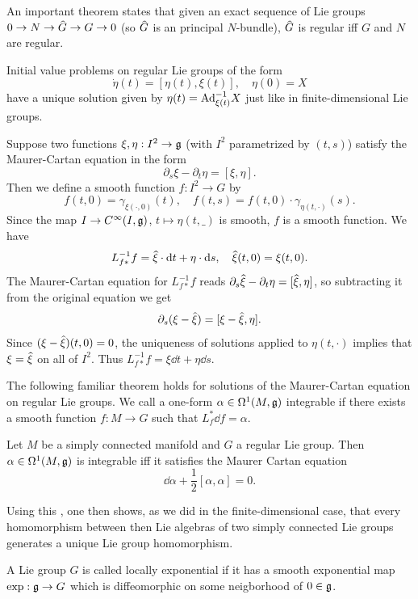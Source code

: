An important theorem states that given an exact sequence of Lie groups $0\to N\to \wh{G}\to G\to 0$ (so $\wh{G}$ is an principal $N$-bundle), $\wh{G}$ is regular iff $G$ and $N$ are regular.

Initial value problems on regular Lie groups of the form
\[\dot\eta(t)=[\eta(t),\xi(t)],\quad \eta(0)=X\]
have a unique solution given by $\eta(t)=\mathrm{Ad}_{\xi(t)}^{-1
}X$ just like in finite-dimensional Lie groups.


\begin{rem}
    Suppose two functions $\xi,\eta:I^2\to \mathfrak{g}$ (with $I^2$ parametrized by $(t,s)$) satisfy the Maurer-Cartan equation in the form
    \[\partial_s \xi-\partial_t \eta=[\xi,\eta].\]
    Then we define a smooth function $f:I^2\to G$ by
    \[f(t,0)=\gamma_{\xi(\cdot,0)}(t),\quad f(t,s)=f(t,0)\cdot \gamma_{\eta(t,\cdot)}(s).\]
    Since the map $I\to C^\infty(I,\mathfrak{g})$, $t\mapsto \eta(t,\_)$ is smooth, $f$ is a smooth function. We have
    \[L_{f\ast}^{-1}f=\wh{\xi}\cdot \dd t+\eta\cdot \dd s,\quad \wh{\xi}(t,0)=\xi(t,0).\]
    The Maurer-Cartan equation for $L_{f\ast}^{-1}f$ reads $\partial_s \wh{\xi}-\partial_t\eta=[\wh{\xi},\eta]$, so subtracting it from the original equation we get
    \[\partial_s(\xi-\wh{\xi})=[\xi-\wh{\xi},\eta].\]
    Since $(\xi-\wh{\xi})(t,0)=0$, the uniqueness of solutions applied to $\eta(t,\cdot)$ implies that $\xi=\wh{\xi}$ on all of $I^2$. Thus $L_{f\ast}^{-1}f=\xi\dd t+\eta\dd s$.
\end{rem}

The following familiar theorem holds for solutions of the Maurer-Cartan equation on regular Lie groups. We call a one-form $\alpha\in\Omega^1(M,\mathfrak{g})$ integrable if there exists a smooth function $f:M\to G$ such that $L_f^\ast \dd f=\alpha$.

\begin{thm}
    Let $M$ be a simply connected manifold and $G$ a regular Lie group. Then $\alpha\in\Omega^1(M,\mathfrak{g})$ is integrable iff it satisfies the Maurer Cartan equation
    \[\dd\alpha +\frac12[\alpha,\alpha]=0.\]
\end{thm}

Using this , one then shows, as we did in the finite-dimensional case, that every homomorphism between then Lie algebras of two simply connected Lie groups generates a unique Lie group homomorphism.

\begin{defn}
    A Lie group $G$ is called locally exponential if it has a smooth exponential map $\exp:\mathfrak{g}\to G$ which is diffeomorphic on some neigborhood of $0\in\mathfrak{g}$.
\end{defn}

